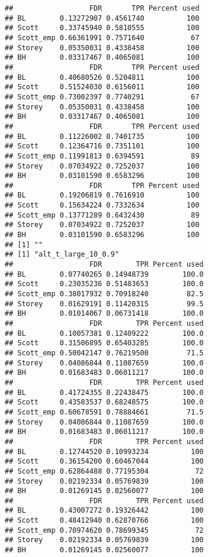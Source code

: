 \documentclass{article}\usepackage[]{graphicx}\usepackage[]{color}
\makeatletter
\newenvironment{kframe}{%
 \def\at@end@of@kframe{}%
 \ifinner\ifhmode%
  \def\at@end@of@kframe{\end{minipage}}%
  \begin{minipage}{\columnwidth}%
 \fi\fi%
 \def\FrameCommand##1{\hskip\@totalleftmargin \hskip-\fboxsep
 \colorbox{shadecolor}{##1}\hskip-\fboxsep
     \hskip-\linewidth \hskip-\@totalleftmargin \hskip\columnwidth}%
 \MakeFramed {\advance\hsize-\width
   \@totalleftmargin\z@ \linewidth\hsize
   \@setminipage}}%
 {\par\unskip\endMakeFramed%
 \at@end@of@kframe}
\newenvironment{knitrout}{}{} %
\makeatother
\begin{document}
\begin{knitrout}
\begin{kframe}
\begin{verbatim}
##                  FDR       TPR Percent used
## BL        0.13272907 0.4561740          100
## Scott     0.33745940 0.5810555          100
## Scott_emp 0.66361991 0.7571640           67
## Storey    0.05350031 0.4338458          100
## BH        0.03317467 0.4065081          100
##                  FDR       TPR Percent used
## BL        0.40680526 0.5204811          100
## Scott     0.51524030 0.6156011          100
## Scott_emp 0.73002397 0.7740291           67
## Storey    0.05350031 0.4338458          100
## BH        0.03317467 0.4065081          100
##                  FDR       TPR Percent used
## BL        0.11226002 0.7401735          100
## Scott     0.12364716 0.7351101          100
## Scott_emp 0.11991813 0.6394591           89
## Storey    0.07034922 0.7252037          100
## BH        0.03101590 0.6583296          100
##                  FDR       TPR Percent used
## BL        0.19206819 0.7616910          100
## Scott     0.15634224 0.7332634          100
## Scott_emp 0.13771289 0.6432430           89
## Storey    0.07034922 0.7252037          100
## BH        0.03101590 0.6583296          100
## [1] ""
## [1] "alt_t_large_10_0.9"
##                  FDR        TPR Percent used
## BL        0.07740265 0.14948739        100.0
## Scott     0.23035236 0.51483653        100.0
## Scott_emp 0.38017932 0.70918240         82.5
## Storey    0.01629191 0.11420315         99.5
## BH        0.01014067 0.06731418        100.0
##                  FDR        TPR Percent used
## BL        0.10057381 0.12409222        100.0
## Scott     0.31506895 0.65403285        100.0
## Scott_emp 0.50042147 0.76219500         71.5
## Storey    0.04086844 0.11087659        100.0
## BH        0.01683483 0.06011217        100.0
##                  FDR        TPR Percent used
## BL        0.41724355 0.22438475        100.0
## Scott     0.43583537 0.68248575        100.0
## Scott_emp 0.60678591 0.78884661         71.5
## Storey    0.04086844 0.11087659        100.0
## BH        0.01683483 0.06011217        100.0
##                  FDR        TPR Percent used
## BL        0.12744520 0.10993234          100
## Scott     0.36154200 0.60467044          100
## Scott_emp 0.62864488 0.77195304           72
## Storey    0.02192334 0.05769839          100
## BH        0.01269145 0.02560077          100
##                  FDR        TPR Percent used
## BL        0.43007272 0.19326442          100
## Scott     0.48412940 0.62870766          100
## Scott_emp 0.70974620 0.78699345           72
## Storey    0.02192334 0.05769839          100
## BH        0.01269145 0.02560077          100

\end{verbatim}
\end{kframe}
\end{knitrout}
\end{document}
